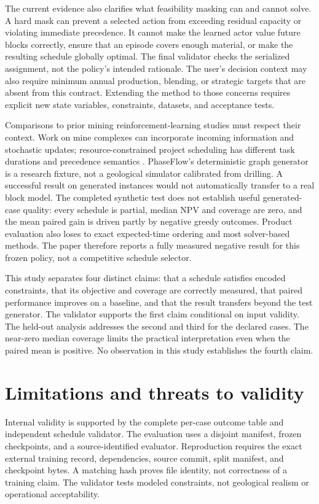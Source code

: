 \documentclass[11pt]{article}
\begin{document}
The current evidence also clarifies what feasibility masking can and cannot solve. A hard mask can prevent a selected action from exceeding residual capacity or violating immediate precedence. It cannot make the learned actor value future blocks correctly, ensure that an episode covers enough material, or make the resulting schedule globally optimal. The final validator checks the serialized assignment, not the policy's intended rationale. The user's decision context may also require minimum annual production, blending, or strategic targets that are absent from this contract. Extending the method to those concerns requires explicit new state variables, constraints, datasets, and acceptance tests.

Comparisons to prior mining reinforcement-learning studies must respect their context. Work on mine complexes can incorporate incoming information and stochastic updates; resource-constrained project scheduling has different task durations and precedence semantics \cite{kumar2021,carvalho2023,teichteil2023,zhao2022}. PhaseFlow's deterministic graph generator is a research fixture, not a geological simulator calibrated from drilling. A successful result on generated instances would not automatically transfer to a real block model. The completed synthetic test does not establish useful generated-case quality: every schedule is partial, median NPV and coverage are zero, and the mean paired gain is driven partly by negative greedy outcomes. Product evaluation also loses to exact expected-time ordering and most solver-based methods. The paper therefore reports a fully measured negative result for this frozen policy, not a competitive schedule selector.

This study separates four distinct claims: that a schedule satisfies encoded constraints, that its objective and coverage are correctly measured, that paired performance improves on a baseline, and that the result transfers beyond the test generator. The validator supports the first claim conditional on input validity. The held-out analysis addresses the second and third for the declared cases. The near-zero median coverage limits the practical interpretation even when the paired mean is positive. No observation in this study establishes the fourth claim.

\section{Limitations and threats to validity}
Internal validity is supported by the complete per-case outcome table and independent schedule validator. The evaluation uses a disjoint manifest, frozen checkpoints, and a source-identified evaluator. Reproduction requires the exact external training record, dependencies, source commit, split manifest, and checkpoint bytes. A matching hash proves file identity, not correctness of a training claim. The validator tests modeled constraints, not geological realism or operational acceptability.
\end{document}
